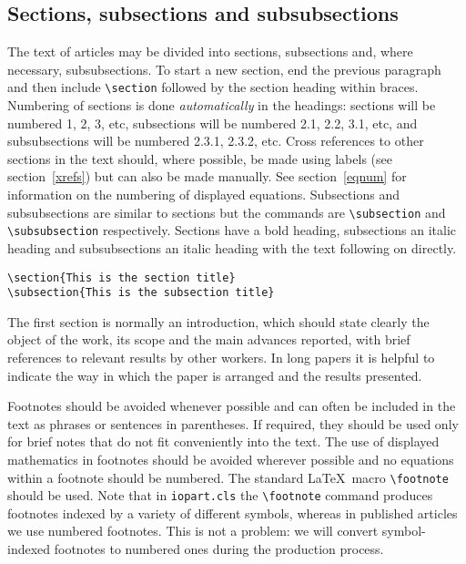 \documentclass[12pt]{iopart}
\begin{document}
\subsection{Sections, subsections and subsubsections}
The text of articles may be divided into sections, subsections and, where necessary, 
subsubsections. To start a new section, end the previous paragraph and 
then include \verb"\section" followed by the section heading within braces. 
Numbering of sections is done {\it automatically} in the headings: 
sections will be numbered 1, 2, 3, etc, subsections will be numbered 
2.1, 2.2,  3.1, etc, and subsubsections will be numbered 2.3.1, 2.3.2, 
etc.  Cross references to other sections in the text should, where
possible, be made using 
labels (see section~\ref{xrefs}) but can also
be made manually. See section~\ref{eqnum} for information on the numbering of displayed equations. Subsections and subsubsections are 
similar to sections but 
the commands are \verb"\subsection" and \verb"\subsubsection" respectively. 
Sections have a bold heading, subsections an italic heading and 
subsubsections an italic heading with the text following on directly.
\small\begin{verbatim}
\section{This is the section title}
\subsection{This is the subsection title}
\end{verbatim}\normalsize

The first section is normally an introduction,  which should state clearly 
the object of the work, its scope and the main advances reported, with 
brief references to relevant results by other workers. In long papers it is 
helpful to indicate the way in which the paper is arranged and the results 
presented.

Footnotes should be avoided whenever possible and can often be included in the text as phrases or sentences in parentheses. If required, they should be used only for brief notes that do not fit conveniently into the text. The use of 
displayed mathematics in footnotes should be avoided wherever possible and no equations within a footnote should be numbered. 
The standard \LaTeX\ macro \verb"\footnote" should be used.  Note that in \verb"iopart.cls" the \verb"\footnote" command
produces footnotes indexed by a variety of different symbols,
whereas in published articles we use numbered footnotes.  This
is not a problem: we will convert symbol-indexed footnotes to numbered ones during the production process.
\end{document}
